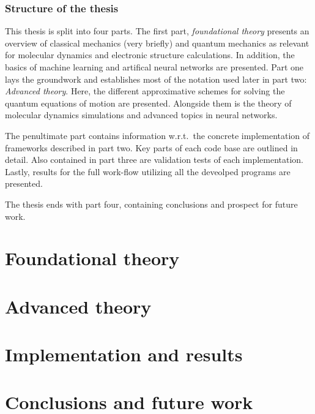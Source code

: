 \documentclass[twoside,english]{uiofysmaster}
\begin{document}
\section{Structure of the thesis}
This thesis is split into four parts. The first part, \emph{foundational theory} presents an overview of classical mechanics (very briefly) and quantum mechanics as relevant for molecular dynamics and electronic structure calculations. In addition, the basics of machine learning and artifical neural networks are presented. Part one lays the groundwork and establishes most of the notation used later in part two: \emph{Advanced theory}. Here, the different approximative schemes for solving the quantum equations of motion are presented. Alongside them is the theory of molecular dynamics simulations and advanced topics in neural networks.

The penultimate part contains information w.r.t.\ the concrete implementation of frameworks described in part two. Key parts of each code base are outlined in detail. Also contained in part three are validation tests of each implementation. Lastly, results for the full work-flow utilizing all the deveolped programs are presented.

The thesis ends with part four, containing conclusions and prospect for future work.

\nocite{ISO80000}
\nocite{stende}
\nocite{treider}
\nocite{dragly}

\part{Foundational theory}




\part{Advanced theory}




\part{Implementation and results}





\part{Conclusions and future work}


\begin{appendices}
\appendixpage
\noappendicestocpagenum
\addappheadtotoc

\end{appendices}



\printbibliography
\end{document}

